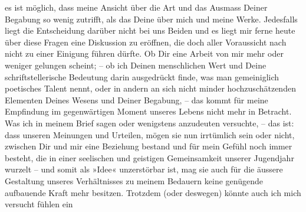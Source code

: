 \begin{ledgroupsized}[t]{13cm}
               es ist möglich, dass meine Ansicht über die Art und das Ausmass Deiner Begabung so
               wenig zutrifft, als das Deine über mich und meine Werke.\pend
           \pstart
           Jedesfalls liegt die Entscheidung darüber nicht bei uns Beiden und es liegt mir ferne
                  heute über diese Fragen eine Diskussion zu
               eröffnen, die doch aller Voraussicht nach nicht zu einer Einigung führen dürfte.\pend
           \pstart
           Ob Dir eine Arbeit von mir mehr oder weniger gelungen scheint; – ob ich Deinen
               menschlichen Wert und Deine schriftstellerische Bedeutung darin ausgedrückt finde,
               was man gemeiniglich poetisches Talent nennt, oder in andern an sich nicht minder
               hochzuschätzenden Elementen Deines Wesens und Deiner Begabung, – das kommt für meine
               Empfindung im gegenwärtigen Moment unseres Lebens nicht mehr in Betracht.\pend
           \pstart
           Was ich in meinem Brief sagen oder wenigstens anzudeuten versuchte, – das ist: dass
                   unseren Meinungen und Urteilen, mögen sie nun
               irrtümlich sein oder nicht, zwischen Dir und mir eine Beziehung bestand und für mein
               Gefühl noch immer besteht, die in einer seelischen und geistigen Gemeinsamkeit
               unserer Jugendjahr wurzelt – und somit als »Idee« unzerstörbar ist, mag sie auch {\pb}für die äussere Gestaltung unseres Verhältnisses zu
               meinem Bedauern keine genügende aufbauende Kraft mehr besitzen.\pend
           \pstart
           Trotzdem (oder deswegen) könnte auch ich mich versucht fühlen ein \label{K_L03519-2v}
\end{ledgroupsized}
